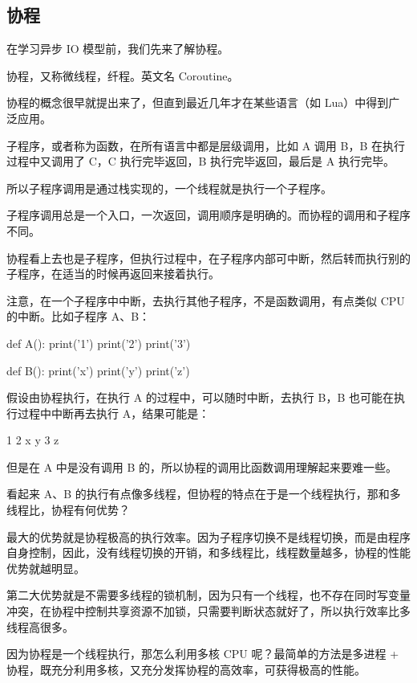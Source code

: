 \hypertarget{ux534fux7a0b}{%
\subsection{协程}\label{ux534fux7a0b}}

在学习异步 IO 模型前，我们先来了解协程。

协程，又称微线程，纤程。英文名 Coroutine。

协程的概念很早就提出来了，但直到最近几年才在某些语言（如
Lua）中得到广泛应用。

子程序，或者称为函数，在所有语言中都是层级调用，比如 A 调用 B，B
在执行过程中又调用了 C，C 执行完毕返回，B 执行完毕返回，最后是 A
执行完毕。

所以子程序调用是通过栈实现的，一个线程就是执行一个子程序。

子程序调用总是一个入口，一次返回，调用顺序是明确的。而协程的调用和子程序不同。

协程看上去也是子程序，但执行过程中，在子程序内部可中断，然后转而执行别的子程序，在适当的时候再返回来接着执行。

注意，在一个子程序中中断，去执行其他子程序，不是函数调用，有点类似 CPU
的中断。比如子程序 A、B：

\begin{pythoncode}
def A():
    print('1')
    print('2')
    print('3')

def B():
    print('x')
    print('y')
    print('z')
\end{pythoncode}

假设由协程执行，在执行 A 的过程中，可以随时中断，去执行 B，B
也可能在执行过程中中断再去执行 A，结果可能是：

\begin{pythoncode}
1
2
x
y
3
z
\end{pythoncode}

但是在 A 中是没有调用 B 的，所以协程的调用比函数调用理解起来要难一些。

看起来 A、B
的执行有点像多线程，但协程的特点在于是一个线程执行，那和多线程比，协程有何优势？

最大的优势就是协程极高的执行效率。因为子程序切换不是线程切换，而是由程序自身控制，因此，没有线程切换的开销，和多线程比，线程数量越多，协程的性能优势就越明显。

第二大优势就是不需要多线程的锁机制，因为只有一个线程，也不存在同时写变量冲突，在协程中控制共享资源不加锁，只需要判断状态就好了，所以执行效率比多线程高很多。

因为协程是一个线程执行，那怎么利用多核 CPU 呢？最简单的方法是多进程 +
协程，既充分利用多核，又充分发挥协程的高效率，可获得极高的性能。

